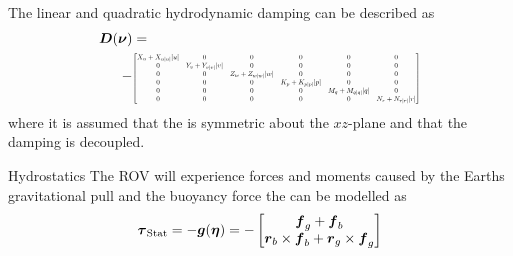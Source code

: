 \documentclass[11pt]{beamer}
\newcommand\scalemath[2]{\scalebox{#1}{\mbox{\ensuremath{\displaystyle #2}}}}
\begin{document}
\begin{frame}
The linear and quadratic hydrodynamic damping can be described as
\begin{align}
\begin{split}
    \damping(\nuVector) &= \\
    -& \scalemath{0.5}{\begin{bmatrix}
        \Xu+\Xuabsu\abs{u} & 0 & 0 & 0 & 0 & 0 \\
        0 & \Yv+\Yvabsv\abs{v} & 0 & 0 & 0 & 0 \\
        0 & 0 & \Zw+\Zwabsw\abs{w} & 0 & 0 & 0 \\
        0 & 0 & 0 & \Kp+\Kpabsp\abs{p} & 0 & 0 \\
        0 & 0 & 0 & 0 & \Mq+\Mqabsq\abs{q} & 0 \\
        0 & 0 & 0 & 0 & 0 & \Nr+\Nrabsr\abs{r} \\
    \end{bmatrix}}
    \end{split}
\end{align}
where it is assumed that the \abbrROV is symmetric about the $xz$-plane and that the damping is decoupled.
\end{frame}

\begin{frame}{Hydrostatics}
The ROV will experience forces and moments caused by the Earths gravitational pull and the buoyancy force the can be modelled as 
\begin{equation}\label{eq:stat}
\boldsymbol{\tau}_{\text{Stat}}=-\boldsymbol{g}(\boldsymbol{\eta}) = - \begin{bmatrix}
    \boldsymbol{f}_g + \boldsymbol{f}_b \\
    \boldsymbol{r}_b \times \boldsymbol{f}_b + \boldsymbol{r}_g \times \boldsymbol{f}_g 
     \end{bmatrix}
\end{equation} 
\end{frame}
\end{document}
